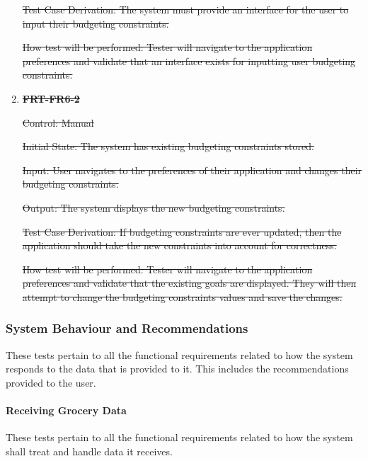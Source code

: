 \documentclass[12pt, titlepage]{article}
\begin{document}
\begin{enumerate}
\sout{Test Case Derivation: The system must provide an interface for the user to input their budgeting constraints.}
          
\sout{How test will be performed: Tester will navigate to the application preferences and validate that an interface exists for inputting user budgeting constraints.}

\item{\sout{\textbf{FRT-FR6-2}}}

\sout{Control: Manual}
          
\sout{Initial State: The system has existing budgeting constraints stored.}

\sout{Input: User navigates to the preferences of their application and changes their budgeting constraints.}
          
\sout{Output: The system displays the new budgeting constraints.}

\sout{Test Case Derivation: If budgeting constraints are ever updated, then the application should take the new constraints into account
for correctness.}

\sout{How test will be performed: Tester will navigate to the application preferences and validate that the existing goals are displayed. They will then attempt to change the budgeting constraints values and save the changes.}

\end{enumerate}

\subsubsection{System Behaviour and Recommendations}

These tests pertain to all the functional requirements related to how the system responds to the data that is provided to it. This includes the recommendations provided to the user.

\paragraph{Receiving Grocery Data}

These tests pertain to all the functional requirements related to how the system shall treat and handle data it receives.
\end{document}
